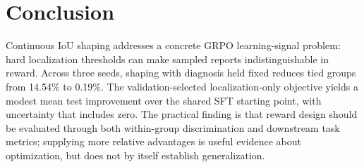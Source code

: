 \documentclass[conference]{IEEEtran}
\begin{document}
\section{Conclusion}
Continuous IoU shaping addresses a concrete GRPO learning-signal problem: hard localization thresholds can make sampled reports indistinguishable in reward. Across three seeds, shaping with diagnosis held fixed reduces tied groups from 14.54\% to 0.19\%. The validation-selected localization-only objective yields a modest mean test improvement over the shared SFT starting point, with uncertainty that includes zero. The practical finding is that reward design should be evaluated through both within-group discrimination and downstream task metrics; supplying more relative advantages is useful evidence about optimization, but does not by itself establish generalization.



\end{document}
